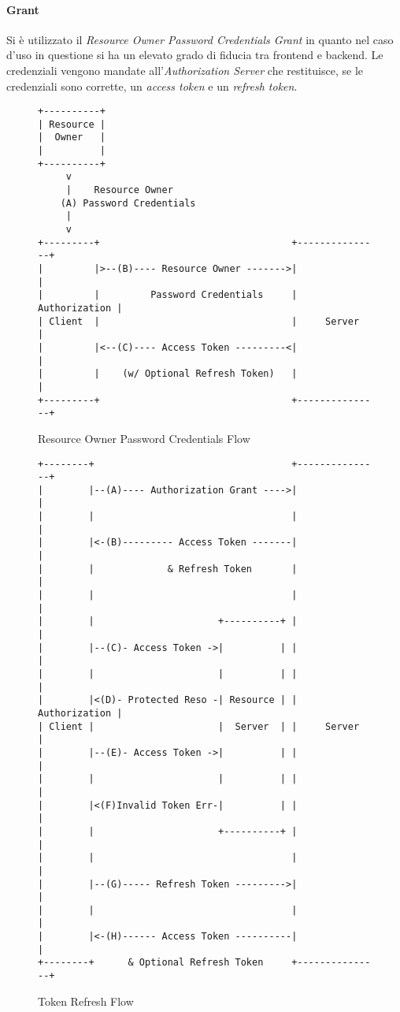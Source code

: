 \paragraph{Grant}
Si è utilizzato il \textit{Resource Owner Password Credentials Grant} \cite{GRANT} in quanto nel caso d'uso in questione si ha un elevato grado di fiducia tra frontend e backend.
Le credenziali vengono mandate all'\textit{Authorization Server} che restituisce, se le credenziali sono corrette, un \textit{access token} e un \textit{refresh token}.\\
\begin{figure}[h]
\begin{center}
\label{fig:grantflow}
\begin{verbatim}
+----------+
| Resource |
|  Owner   |
|          |
+----------+
     v
     |    Resource Owner
    (A) Password Credentials
     |
     v
+---------+                                  +---------------+
|         |>--(B)---- Resource Owner ------->|               |
|         |         Password Credentials     | Authorization |
| Client  |                                  |     Server    |
|         |<--(C)---- Access Token ---------<|               |
|         |    (w/ Optional Refresh Token)   |               |
+---------+                                  +---------------+

\end{verbatim}
\caption{Resource Owner Password Credentials Flow \cite{GRANT}}
\end{center}
\end{figure}
\FloatBarrier
\begin{figure}[h]
\begin{center}
\label{fig:refreshflow}
\begin{verbatim}
+--------+                                   +---------------+
|        |--(A)---- Authorization Grant ---->|               |
|        |                                   |               |
|        |<-(B)--------- Access Token -------|               |
|        |             & Refresh Token       |               |
|        |                                   |               |
|        |                      +----------+ |               |
|        |--(C)- Access Token ->|          | |               |
|        |                      |          | |               |
|        |<(D)- Protected Reso -| Resource | | Authorization |
| Client |                      |  Server  | |     Server    |
|        |--(E)- Access Token ->|          | |               |
|        |                      |          | |               |
|        |<(F)Invalid Token Err-|          | |               |
|        |                      +----------+ |               |
|        |                                   |               |
|        |--(G)----- Refresh Token --------->|               |
|        |                                   |               |
|        |<-(H)------ Access Token ----------|               |
+--------+      & Optional Refresh Token     +---------------+

\end{verbatim}
\caption{Token Refresh Flow \cite{REFRESH}}
\end{center}
\end{figure}
